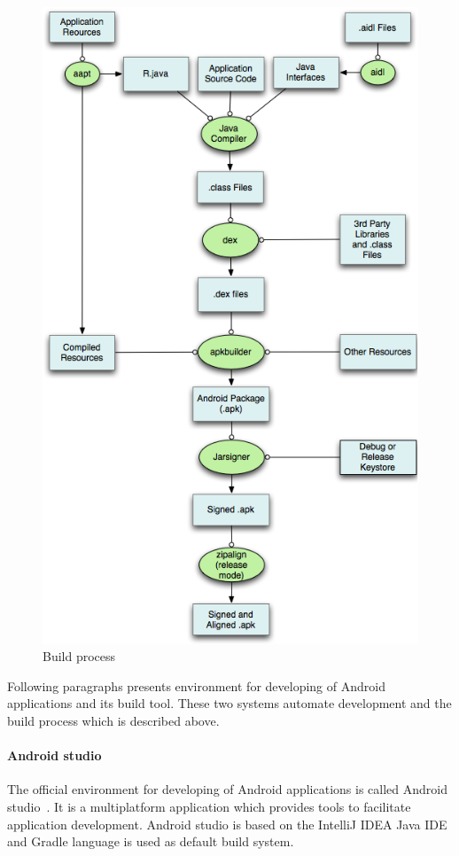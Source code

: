 \begin{figure}[h!]
    \centering
    \includegraphics[scale=0.45]{fig/build.png}
    \caption{Build process \cite{AndroidDev}}
\end{figure}

Following paragraphs presents environment for developing of Android applications and its build tool. These two
systems automate development and the build process which is described above.

\paragraph{Android studio}
The official environment for developing of Android applications is called Android studio~\cite{AndroidDev}. It is a
multiplatform application which provides tools to facilitate application development. Android studio is based on the
IntelliJ IDEA Java IDE and Gradle language is used as default build system.

